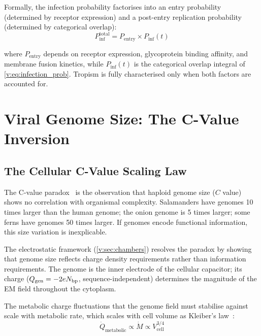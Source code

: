 Formally, the infection probability factorises into an entry probability (determined by receptor expression) and a post-entry replication probability (determined by categorical overlap):
\begin{equation}
  P_{\mathrm{inf}}^{\mathrm{total}} = P_{\mathrm{entry}} \times P_{\mathrm{inf}}(t)
  \label{v:eq:total_infection}
\end{equation}

where $P_{\mathrm{entry}}$ depends on receptor expression, glycoprotein binding affinity, and membrane fusion kinetics, while $P_{\mathrm{inf}}(t)$ is the categorical overlap integral of \cref{v:eq:infection_prob}. Tropism is fully characterised only when both factors are accounted for.

\section{Viral Genome Size: The C-Value Inversion}
\label{v:sec:cvalue}

\subsection{The Cellular C-Value Scaling Law}

The C-value paradox~\cite{Thomas1971,Gregory2001} is the observation that haploid genome size ($C$ value) shows no correlation with organismal complexity. Salamanders have genomes 10 times larger than the human genome; the onion genome is 5 times larger; some ferns have genomes 50 times larger. If genomes encode functional information, this size variation is inexplicable.

The electrostatic framework (\cref{v:sec:chambers}) resolves the paradox by showing that genome size reflects charge density requirements rather than information requirements. The genome is the inner electrode of the cellular capacitor; its charge ($Q_{\mathrm{gen}} = -2e N_{\mathrm{bp}}$, sequence-independent) determines the magnitude of the EM field throughout the cytoplasm.

The metabolic charge fluctuations that the genome field must stabilise against scale with metabolic rate, which scales with cell volume as Kleiber's law~\cite{Kleiber1932,West1997}:
\begin{equation}
  \dot{Q}_{\mathrm{metabolic}} \propto \dot{M} \propto V_{\mathrm{cell}}^{3/4}
  \label{v:eq:kleiber}
\end{equation}


